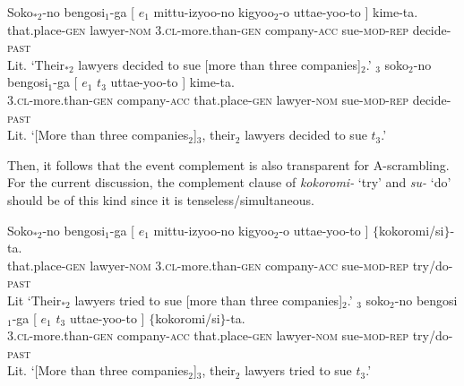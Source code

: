 \documentclass[output=paper]{langsci/langscibook}
\begin{document}
\ea\label{shimamu29} 
\begin{xlist} 
\ex\label{shimamu29a}  \gll Soko$_{*2}$-no bengosi$_1$-ga [ $e_1$ mittu-izyoo-no kigyoo$_2$-o uttae-yoo-to ] kime-ta.\\
that.place-\textsc{gen} lawyer-\textsc{nom} {} {} 3.\textsc{cl}-more.than-\textsc{gen} company-\textsc{acc} sue-\textsc{mod-rep} {} decide-\textsc{past}\\
\glt Lit. `Their$_{*2}$ lawyers decided to sue [more than three companies]$_{2}$.'
\ex\label{shimamu29b}  $_3$ soko$_{2}$-no bengosi$_1$-ga [ $e_1$ $t_3$ uttae-yoo-to ] kime-ta.\\
\phantom{[}3.\textsc{cl}-more.than-\textsc{gen} company-\textsc{acc} that.place-\textsc{gen} lawyer-\textsc{nom} {} {} {} sue-\textsc{mod-rep} {} decide-\textsc{past}\\
\glt Lit. `[More than three companies$_{2}$]$_{3}$, their$_{2}$ lawyers decided to sue $t_3$.'
\end{xlist}
\z
Then, it follows that the event complement is also transparent for A-scrambling. For the current discussion, the complement clause of \textit{kokoromi-} `try' and \textit{su-} `do' should be of this kind since it is tenseless/simultaneous.

\ea\label{shimamu30} 
\begin{xlist} 
\ex \gll Soko$_{*2}$-no bengosi$_1$-ga [ $e_1$ mittu-izyoo-no kigyoo$_2$-o uttae-yoo-to ] $\{$kokoromi/si$\}$-ta.\\
that.place-\textsc{gen} lawyer-\textsc{nom} {} {} 3.\textsc{cl}-more.than-\textsc{gen} company-\textsc{acc} sue-\textsc{mod-rep} {} \phantom{$\{$}try/do-\textsc{past}\\
\glt Lit `Their$_{*2}$ lawyers tried to sue [more than three companies]$_{2}$.'
\ex {}$_3$ soko$_{2}$-no bengosi$_1$-ga [ $e_1$ $t_3$ uttae-yoo-to ] $\{$kokoromi/si$\}$-ta.\\
\phantom{[}3.\textsc{cl}-more.than-\textsc{gen} company-\textsc{acc} that.place-\textsc{gen} lawyer-\textsc{nom} {} {} {} sue-\textsc{mod-rep} {} \phantom{$\{$}try/do-\textsc{past}\\
\glt Lit. `[More than three companies$_{2}$]$_{3}$, their$_{2}$ lawyers tried to sue $t_3$.'
\end{xlist}
\z
\end{document}
